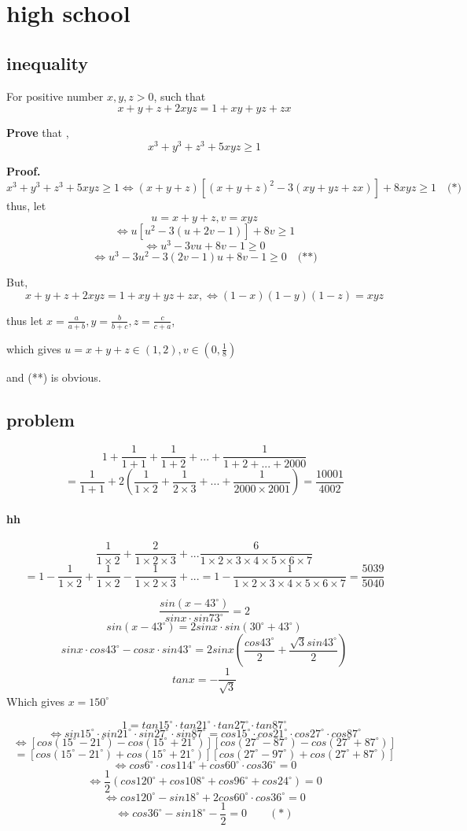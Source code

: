 \documentclass[11pt,a4paper]{article}
\begin{document}
\section{high school}
\subsection{inequality}
For positive number $x,y,z >0$, such that 
\[ x+y+z+2xyz = 1+xy+yz+zx\]

\textbf{Prove } that ,\[x^3+y^3+z^3+5xyz \ge 1\]

\textbf{Proof.}
$$	x^3+y^3+z^3+5xyz \ge 1 \Longleftrightarrow (x+y+z)[(x+y+z)^2-3(xy+yz+zx)] + 8xyz \ge 1 \quad \textbf{(*)}$$
thus, let $$u=x+y+z, v=xyz$$
$$\Longleftrightarrow u[u^2-3(u+2v-1)] + 8v \ge 1$$
$$\Longleftrightarrow u^3-3vu + 8v-1 \ge 0 $$
$$\Longleftrightarrow u^3-3u^2-3(2v-1)u + 8v-1 \ge 0 \quad \textbf{(**)}$$

But, \[ x+y+z+2xyz = 1+xy+yz+zx, \Longleftrightarrow (1-x)(1-y)(1-z) = xyz\]

thus let $x=\frac{a}{a+b},y=\frac{b}{b+c},z=\frac{c}{c+a}$,

which gives $u=x+y+z\in(1,2), v \in(0,\frac{1}{8})$

and (**) is obvious.

\subsection{problem}
$$1+\frac{1}{1+1}+\frac{1}{1+2}+...+\frac{1}{1+2+...+2000}$$
$$=\frac{1}{1+1}+2(\frac{1}{1\times2}+\frac{1}{2\times3}+...+\frac{1}{2000\times2001})=\frac{10001}{4002}$$
\paragraph{hh}
$$\frac{1}{1\times2}+\frac{2}{1\times2\times3}+...\frac{6}{1\times2\times3\times4\times5\times6\times7}$$
$$=1-\frac{1}{1\times2} + \frac{1}{1\times2}-\frac{1}{1\times2\times3}+...=1-\frac{1}{1\times2\times3\times4\times5\times6\times7}=\frac{5039}{5040}$$

$$\frac{sin(x-43^{\circ})}{sinx\cdot sin73^{\circ}}=2$$
$$sin(x-43^{\circ}) = 2sinx\cdot sin(30^{\circ}+43^{\circ})$$
$$sinx\cdot cos43^{\circ}-cosx\cdot sin43^{\circ}=2sinx(\frac{cos43^{\circ}}{2}+\frac{\sqrt{3}sin43^{\circ}}{2})$$
$$tanx=-\frac{1}{\sqrt{3}}$$
Which gives $x=150^{\circ}$

$$1=tan15^{\circ}\cdot tan21^{\circ}\cdot tan27^{\circ}\cdot tan87^{\circ} $$
$$\Longleftrightarrow sin15^{\circ}\cdot sin21^{\circ}\cdot sin27^{\circ}\cdot sin87^{\circ} = cos15^{\circ}\cdot  cos21^{\circ}\cdot cos27^{\circ}\cdot cos87^{\circ}$$
$$\Longleftrightarrow [cos(15^{\circ}-21^{\circ})-cos(15^{\circ}+21^{\circ})][cos(27^{\circ}-87^{\circ})-cos(27^{\circ}+87^{\circ})]$$
$$=[cos(15^{\circ}-21^{\circ})+cos(15^{\circ}+21^{\circ})][cos(27^{\circ}-97^{\circ})+cos(27^{\circ}+87^{\circ})]$$
$$\Longleftrightarrow cos6^{\circ}\cdot cos114^{\circ} + cos60^{\circ}\cdot cos36^{\circ}=0$$
$$\Longleftrightarrow \frac{1}{2}(cos120^{\circ}+cos108^{\circ}+cos96^{\circ}+cos24^{\circ})=0$$
$$\Longleftrightarrow cos120^{\circ}-sin18^{\circ}+2cos60^{\circ}\cdot cos36^{\circ}=0 $$
$$\Longleftrightarrow cos36^{\circ} - sin18^{\circ} -\frac{1}{2}=0 \quad\quad  (*)$$
\end{document}
